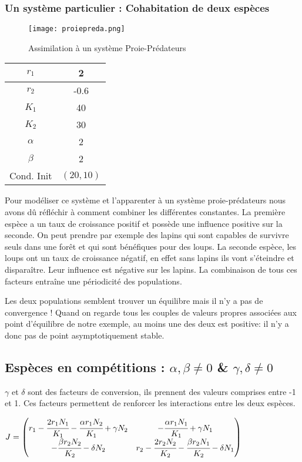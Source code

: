 \documentclass[11pt]{article}
\begin{document}
\subsubsection{Un système particulier : Cohabitation de deux espèces}
\begin{center}

\begin{figure}[H]
    \centering
    \texttt{[image: proiepreda.png]}
    \caption{Assimilation à un système Proie-Prédateurs}
    \label{1}
\end{figure}

\begin{tabular}{c|c}
     $r_1$&2  \\
     \hline
     $r_2$&-0.6 \\
     \hline
     $K_1$&40 \\
     \hline
     $K_2$&30\\
     \hline
     $\alpha$&2\\
     \hline
     $\beta$&2\\
     \hline
     Cond. Init& $(20,10)$
\end{tabular}
\end{center}

Pour modéliser ce système et l'apparenter à un système proie-prédateurs nous avons dû réfléchir à comment combiner les différentes constantes. La première espèce a un taux de croissance positif et possède une influence positive sur la seconde. On peut prendre par exemple des lapins qui sont capables de survivre seuls dans une forêt et qui sont bénéfiques pour des loups. La seconde espèce, les loups ont un taux de croissance négatif, en effet sans lapins ils vont s'éteindre et disparaître. Leur influence est négative sur les lapins. La combinaison de tous ces facteurs entraîne une périodicité des populations.

Les deux populations semblent trouver un équilibre mais il n'y a pas de convergence ! Quand on regarde tous les couples de valeurs propres associées aux point d'équilibre de notre exemple, au moins une des deux est positive: il n'y a donc pas de point asymptotiquement stable.


\subsection{Espèces en compétitions : $\alpha,\beta \ne 0$ \& $\gamma,\delta \ne 0$ }
$\gamma$ et $\delta$ sont des facteurs de conversion, ils prennent des valeurs comprises entre -1 et 1. Ces facteurs permettent de renforcer les interactions entre les deux espèces. 
\begin{center}
\begin{math}
J = 
\begin{pmatrix} 
r_1 - \cfrac{2r_1N_1}{K_1} - \cfrac{\alpha r_1N_2}{K_1} + \gamma N_2 & - \cfrac{\alpha r_1N_1}{K_1} + \gamma N_1 \\
- \cfrac{\beta r_2N_2}{K_2} - \delta N_2   & r_2 - \cfrac{2r_2N_2}{K_2} - \cfrac{\beta r_2N_1}{K_2} - \delta N_1  \\
\end{pmatrix}
\end{math}
\end{center}
\end{document}

